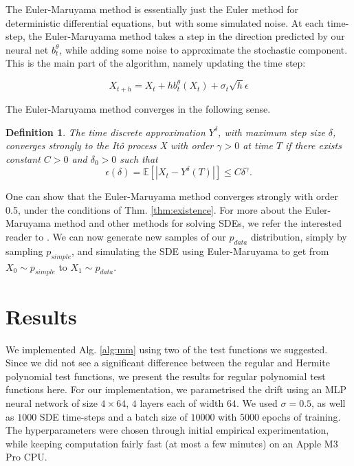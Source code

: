 \documentclass[12pt]{article}
\theoremstyle{break}
\newtheorem{definition}{Definition}[section]
\begin{document}
The Euler-Maruyama method is essentially just the Euler method for deterministic differential equations, but with some simulated noise. At each time-step, the Euler-Maruyama method takes a step in the direction predicted by our neural net $b_t^{\theta}$, while adding some noise to approximate the stochastic component. This is the main part of the algorithm, namely updating the time step:

\begin{equation*}
	X_{t+h} = X_t + h b_t^{\theta} (X_t) + \sigma_t \sqrt{h} \epsilon
\end{equation*}

The Euler-Maruyama method converges in the following sense.

\begin{definition}
	The time discrete approximation $Y^\delta$, with maximum step size $\delta$, converges strongly to the Itô process X with order $\gamma > 0$ at time $T$ if there exists constant $C>0$ and $\delta_0 > 0$ such that
	\begin{equation*}
		\epsilon(\delta) = \mathbb{E}\left[\left|X_t - Y^\delta (T)\right|\right] \leq C\delta^\gamma.
	\end{equation*}
\end{definition}

One can show that the Euler-Maruyama method converges strongly with order 0.5, under the conditions of Thm. \ref{thm:existence}. \cite{kloeden1999} For more about the Euler-Maruyama method and other methods for solving SDEs, we refer the interested reader to \cite{kloeden1999}. 
We can now generate new samples of our $p_{data}$ distribution, simply by sampling $p_{simple}$, and simulating the SDE using Euler-Maruyama to get from $X_0 \sim p_{simple}$ to $X_1 \sim p_{data}$.

\section{Results}
We implemented Alg. \ref{alg:mm} using two of the test functions we suggested. Since we did not see a significant difference between the regular and Hermite polynomial test functions, we present the results for regular polynomial test functions here. For our implementation, we parametrised the drift using an MLP neural network of size $4 \times 64$, $4$ layers each of width $64$. We used $\sigma = 0.5$, as well as $1000$ SDE time-steps and a batch size of $10000$ with $5000$ epochs of training. The hyperparameters were chosen through initial empirical experimentation, while keeping computation fairly fast (at most a few minutes) on an Apple M3 Pro CPU.
\end{document}
